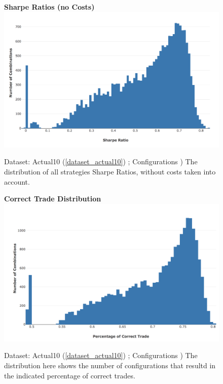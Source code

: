 \documentclass[a4paper,11pt,oneside]{article}
\theoremstyle{plain}
\theoremstyle{definition}
\begin{document}
\begin{figure}[H]
	\centering
	\textbf{Sharpe Ratios (no Costs)}
	\includegraphics[scale=0.35]{images/results/mms/sharpe_ratios.png} 
	\caption[Sharpe Ratios (no Costs)]{Dataset: Actual10 (\ref{dataset_actual10}) ; Configurations )
		\newline The distribution of all strategies Sharpe Ratios, without costs taken into account.}
	\label{figure-sharpe_ratios}
\end{figure}

\begin{figure}[H]
	\centering
	\textbf{Correct Trade Distribution}
	\includegraphics[scale=0.35]{images/results/mms/confusion_dist.png} 
	\caption[Correct Trade Distribution]{Dataset: Actual10 (\ref{dataset_actual10}) ; Configurations )
		\newline The distribution here shows the number of configurations that resultd in the indicated percentage of correct trades.}
	\label{figure-confusion_dist}
\end{figure}
\end{document}

